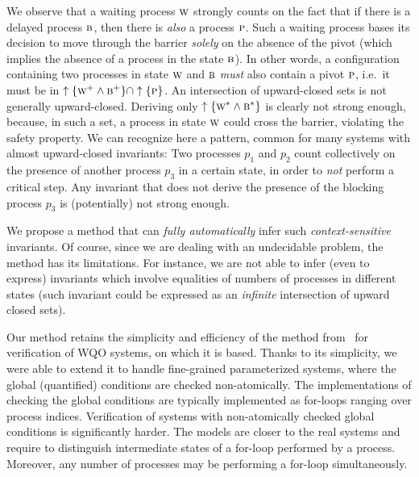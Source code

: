 We observe that a waiting process $\textsc{w}$ strongly counts on the fact that
if there is a delayed process $\textsc{b}$, then there is \emph{also} a process
$\textsc{p}$. %
Such a waiting process bases its decision to move through the barrier
\emph{solely} on the absence of the pivot (which implies the absence
of a process in the state $\textsc{b}$).
%
In other words, a configuration containing two processes in state
$\textsc{w}$ and $\textsc{b}$ \emph{must} also contain a pivot $\textsc{p}$, i.e.\ it must
be in $\uparrow\{\textsc{w}^+\wedge\textsc{b}^+\}\cap\uparrow\{\textsc{p}\}$.
%
An intersection of upward-closed sets is not generally upward-closed.
%
Deriving only $\uparrow\{\textsc{w}^*\wedge\textsc{b}^*\}$ is clearly not strong
enough, because, in such a set, a process in state $\textsc{w}$ could cross
the barrier, violating the safety property.
%
We can recognize here a pattern, common for many systems with almost
upward-closed invariants: %
Two processes $p_1$ and $p_2$ count collectively on the presence of
another process $p_3$ in a certain state, in order to \emph{not}
perform a critical step. %
Any invariant that does not derive the presence of the blocking
process $p_3$ is (potentially) not strong enough.
%

We propose a method that can \emph{fully automatically} infer such
\emph{context-sensitive} invariants. %
Of course, since we are dealing with an undecidable problem, the
method has its limitations. %
For instance, we are not able to infer (even to express) invariants
which involve equalities of numbers of processes in different states
(such invariant could be expressed as an \emph{infinite} intersection
of upward closed sets).

Our method retains the simplicity and efficiency of the method
from~\cite{AbHaHo:view:abstraction} for verification of WQO systems,
on which it is based.
%
Thanks to its simplicity, we were able to extend it to handle
fine-grained parameterized systems, where the global (quantified)
conditions are checked non-atomically. %
%
The implementations of checking the global conditions are typically
implemented as for-loops ranging over process indices.
%
Verification of systems with non-atomically checked global conditions
is significantly harder. The models are closer to the real systems and
require to distinguish intermediate states of a for-loop performed by
a process. Moreover, any number of processes may be performing a
for-loop simultaneously. %
%
%

